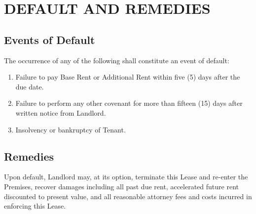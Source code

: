 \section{DEFAULT AND REMEDIES}
\subsection{Events of Default}
The occurrence of any of the following shall constitute an event of default:
\begin{enumerate}[label=(\alph*), leftmargin=2em]
    \item Failure to pay Base Rent or Additional Rent within five (5) days after the due date.
    \item Failure to perform any other covenant for more than fifteen (15) days after written notice from Landlord.
    \item Insolvency or bankruptcy of Tenant.
\end{enumerate}

\subsection{Remedies}
Upon default, Landlord may, at its option, terminate this Lease and re-enter the Premises, recover damages including all past due rent, accelerated future rent discounted to present value, and all reasonable attorney fees and costs incurred in enforcing this Lease.
